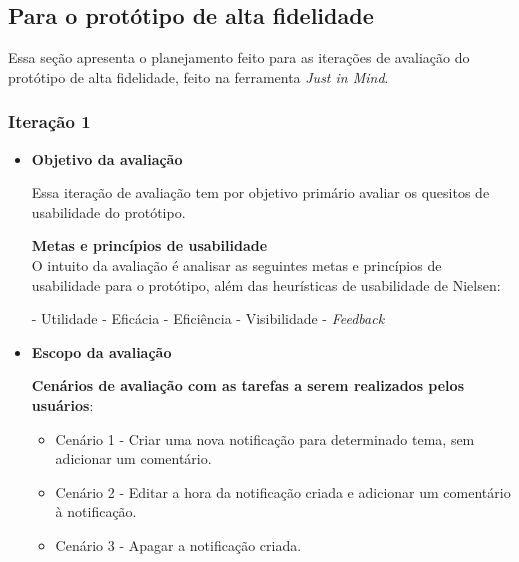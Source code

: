       \subsection{Para o protótipo de alta fidelidade}
	
	Essa seção apresenta o planejamento feito para as iterações de avaliação do protótipo de alta fidelidade, feito na
	ferramenta \textit{Just in Mind}.
	
	\subsubsection{Iteração 1}
	
	  \begin{itemize}
	   \item \textbf{Objetivo da avaliação}
	      
	      \subitem Essa iteração de avaliação tem por objetivo primário avaliar os quesitos de usabilidade do protótipo.
	      
	      \subitem \textbf{Metas e princípios de usabilidade}\\
		O intuito da avaliação é analisar as seguintes metas e princípios de usabilidade para o protótipo, além das
		heurísticas de usabilidade de Nielsen:
		
		\subsubitem - Utilidade
		\subsubitem - Eficácia
		\subsubitem - Eficiência
		\subsubitem - Visibilidade
		\subsubitem - \textit{Feedback}
	    
	   \item \textbf{Escopo da avaliação}
	      
	      \subitem \textbf{Cenários de avaliação com as tarefas a serem realizados pelos usuários}:
		
		\begin{itemize}
		  \item Cenário 1 - Criar uma nova notificação para determinado tema, sem adicionar um comentário.
		    
		    
		  \item Cenário 2 - Editar a hora da notificação criada e adicionar um comentário à notificação.
		    
		    
		  \item Cenário 3 - Apagar a notificação criada.
		    
		  

\end{itemize}
\end{itemize}
